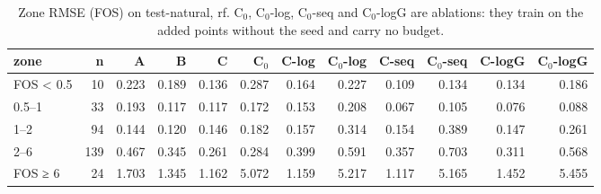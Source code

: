 \begin{table}[htbp]
\centering
\small
\setlength{\tabcolsep}{4pt}
\caption{Zone RMSE (FOS) on test-natural, rf. C$_0$, C$_0$-log, C$_0$-seq and C$_0$-logG are ablations: they train on the added points without the seed and carry no budget.}
\label{tab:test-natural__fos-rmse:zones:rf}
\begin{tabular}{lrrrrrrrrrrr}
\toprule
zone & n & A & B & C & C$_0$ & C-log & C$_0$-log & C-seq & C$_0$-seq & C-logG & C$_0$-logG \\
\midrule
FOS < 0.5 & 10 & 0.223 & 0.189 & 0.136 & 0.287 & 0.164 & 0.227 & 0.109 & 0.134 & 0.134 & 0.186 \\
0.5–1 & 33 & 0.193 & 0.117 & 0.117 & 0.172 & 0.153 & 0.208 & 0.067 & 0.105 & 0.076 & 0.088 \\
1–2 & 94 & 0.144 & 0.120 & 0.146 & 0.182 & 0.157 & 0.314 & 0.154 & 0.389 & 0.147 & 0.261 \\
2–6 & 139 & 0.467 & 0.345 & 0.261 & 0.284 & 0.399 & 0.591 & 0.357 & 0.703 & 0.311 & 0.568 \\
FOS ≥ 6 & 24 & 1.703 & 1.345 & 1.162 & 5.072 & 1.159 & 5.217 & 1.117 & 5.165 & 1.452 & 5.455 \\
\bottomrule
\end{tabular}
\end{table}
